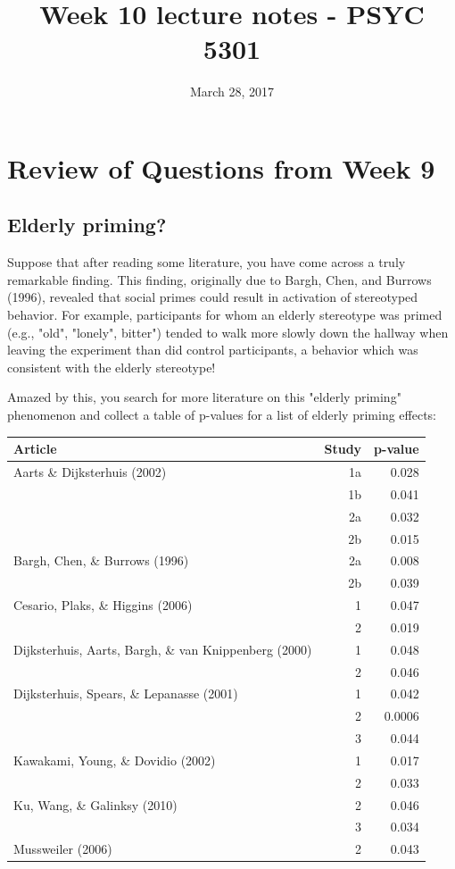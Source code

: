 \documentclass[article,10pt]{article}
\date{March 28, 2017}
\title{Week 10 lecture notes - PSYC 5301}
\begin{document}
\maketitle

\section*{Review of Questions from  Week 9}
\label{sec-1}
\subsection*{Elderly priming?}
\label{sec-1-1}
Suppose that after reading some literature, you have come across a truly remarkable finding.  This finding, originally due to Bargh, Chen, and Burrows (1996), revealed that social primes could result in activation of stereotyped behavior.  For example, participants for whom an elderly stereotype was primed (e.g., "old", "lonely", bitter") tended to walk more slowly down the hallway when leaving the experiment than did control participants, a behavior which was consistent with the elderly stereotype!

Amazed by this, you search for more literature on this "elderly priming" phenomenon and collect a table of p-values for a list of elderly priming effects:

\begin{center}
\begin{tabular}{lrr}
Article & Study & p-value\\
\hline
Aarts \& Dijksterhuis (2002) & 1a & 0.028\\
 & 1b & 0.041\\
 & 2a & 0.032\\
 & 2b & 0.015\\
Bargh, Chen, \& Burrows (1996) & 2a & 0.008\\
 & 2b & 0.039\\
Cesario, Plaks, \& Higgins (2006) & 1 & 0.047\\
 & 2 & 0.019\\
Dijksterhuis, Aarts, Bargh, \& van Knippenberg (2000) & 1 & 0.048\\
 & 2 & 0.046\\
Dijksterhuis, Spears, \& Lepanasse (2001) & 1 & 0.042\\
 & 2 & 0.0006\\
 & 3 & 0.044\\
Kawakami, Young, \& Dovidio (2002) & 1 & 0.017\\
 & 2 & 0.033\\
Ku, Wang, \& Galinksy (2010) & 2 & 0.046\\
 & 3 & 0.034\\
Mussweiler (2006) & 2 & 0.043\\
\end{tabular}
\end{center}
\end{document}
